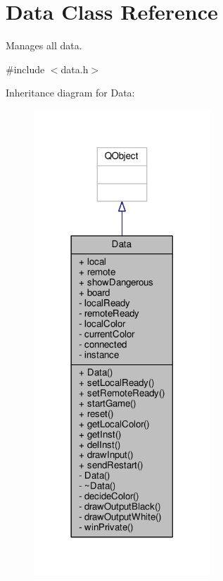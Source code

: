 \hypertarget{classData}{}\section{Data Class Reference}
\label{classData}


Manages all data.  




{\ttfamily \#include $<$data.\+h$>$}



Inheritance diagram for Data\+:
\nopagebreak
\begin{figure}[H]
\begin{center}
\leavevmode
\includegraphics[width=188pt]{classData__inherit__graph}
\end{center}
\end{figure}


